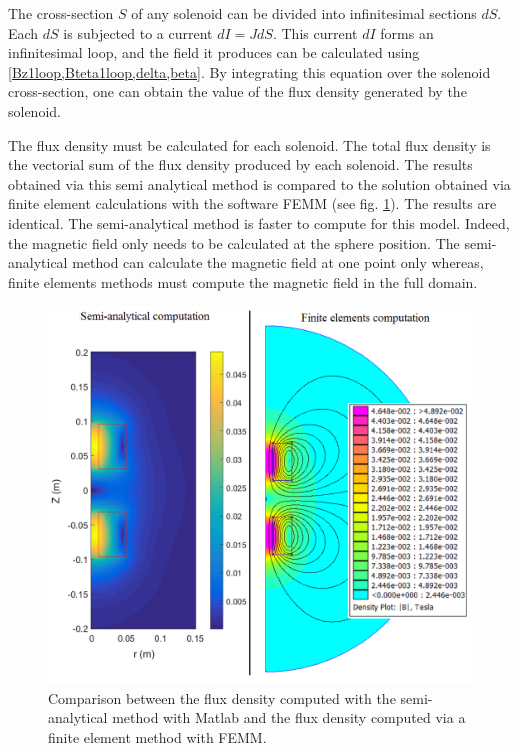 \documentclass[letterpaper, 10 pt, conference]{ieeeconf}  %
\begin{document}
The cross-section $S$ of any solenoid can be divided into infinitesimal sections $dS$. Each $dS$ is subjected to a current $dI=JdS$. This current $dI$ forms an infinitesimal loop, and the field it produces can be calculated using \cref{Bz1loop,Bteta1loop,delta,beta}. By integrating this equation over the solenoid cross-section, one can obtain the value of the flux density generated by the solenoid.\par
The flux density must be calculated for each solenoid. The total flux density is the vectorial sum of the flux density produced by each solenoid. The results obtained via this semi analytical method is compared to the solution obtained via finite element calculations with the software FEMM \cite{femm} (see fig. \ref{Femm_matlab_comparison}). The results are identical. The semi-analytical method is faster to compute for this model. Indeed, the magnetic field only needs to be calculated at the sphere position. The semi-analytical method can calculate the magnetic field at one point only whereas, finite elements methods must compute the magnetic field in the full domain.

\begin{figure}
  \includegraphics[width=\linewidth]{Femm_matlab_comparison.png}
  \caption{Comparison between the flux density computed with the semi-analytical method with {\sc Matlab} and the flux density computed via a finite element method with FEMM.}
  \label{Femm_matlab_comparison}
\end{figure}
\end{document}
